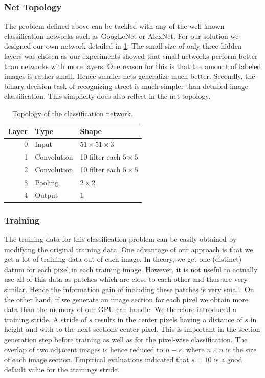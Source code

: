 \subsubsection{Net Topology}
The problem defined above can be tackled with any of the well known
classification networks such as GoogLeNet or AlexNet. For our solution we
designed our own network detailed in \cref{tab:topo}. The small size of only
three hidden layers was chosen as our experiments showed that small networks
perform better than networks with more layers. One reason for this is that the
amount of labeled images is rather small. Hence smaller nets generalize much
better. Secondly, the binary decision task of recognizing street is much
simpler than detailed image classification. This simplicity does also reflect
in the net topology.

\begin{table}[H]
    \normalsize
    \centering
\begin{tabular}{r  l l}
    \toprule
    \textbf{Layer} & \textbf{Type}  & \textbf{Shape}  \\
    \midrule
    0     & Input &  $51 \times 51 \times 3$ \\
    1     & Convolution & 10 filter  each $5 \times 5$ \\
    2     & Convolution & 10 filter  each $5 \times 5$  \\
    3     & Pooling     & $2 \times 2$ \\
    4     & Output     & $1$ \\
    \bottomrule
\end{tabular}
\caption{Topology of the classification network.}
\label{tab:topo}
\end{table}


\subsubsection{Training}
The training data for this classification problem can be easily obtained by
modifying the original training data. One advantage of our approach is that we
get a lot of training data out of each image. In theory, we get one (distinct)
datum for each pixel in each training image. However, it is not useful to
actually use all of this data as patches which are close to each other and thus
are very similar. Hence the information gain of including these patches is very
small. On the other hand, if we generate an image section for each pixel we
obtain more data than the memory of our GPU can handle. We therefore introduced
a training stride. A stride of $s$ results in the center pixels having a
distance of $s$ in height and with to the next sections center pixel. This is
important in the section generation step before training as well as for the
pixel-wise classification. The overlap of two adjacent images is hence reduced
to $n-s$, where $n \times n$ is the size of each image section. Empirical
evaluations indicated that $s=10$ is a good default value for the trainings
stride.

